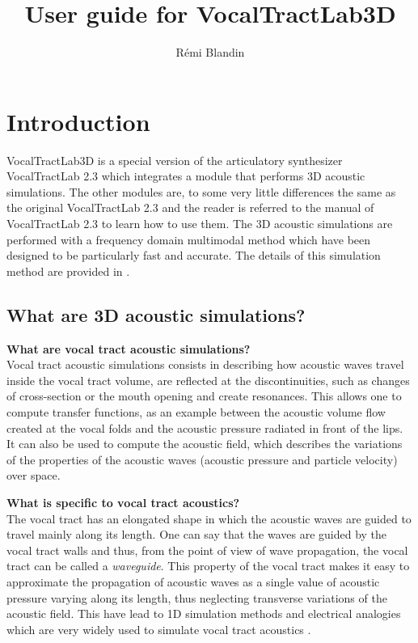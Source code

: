 \documentclass[]{article}
\title{User guide for VocalTractLab3D}
\author{R{\'e}mi Blandin}
\begin{document}
	\maketitle
	
	\section{Introduction}
	
	VocalTractLab3D is a special version of the articulatory synthesizer
	VocalTractLab 2.3 which integrates a module that performs 3D acoustic simulations. The other modules are, to some very little differences the same as the original VocalTractLab 2.3 
	\cite{birkholz2013modeling} and the 
	reader is referred to the manual of VocalTractLab 2.3 to learn
	how to use them.
	The 3D acoustic simulations are performed with a frequency domain
	multimodal method which have been designed to be particularly 
	fast and accurate. The details of this simulation method are 
	provided in \textcite{blandin2022efficient}.
	
	\subsection{What are 3D acoustic simulations?}
	
	\textbf{What are vocal tract acoustic simulations?}\\ 
	Vocal tract acoustic simulations consists in describing how acoustic waves travel
	inside the vocal tract volume, are reflected at the discontinuities, such as 
	changes of cross-section or the mouth opening and create resonances. 
	This allows one to compute transfer functions, as an example between the acoustic volume flow created at the vocal folds and the acoustic pressure radiated in front of the lips. It can also be used to 
	compute the acoustic field, which describes the variations of the  
	properties of the acoustic waves (acoustic pressure and particle velocity) over space.
	
	\textbf{What is specific to vocal tract acoustics?}\\
	The vocal tract has an elongated shape in which the acoustic waves 
	are guided to travel mainly along its length. One can say that the
	waves are guided by the vocal tract walls and thus, from the point
	of view of wave propagation, the vocal tract can be called a 
	\emph{waveguide}.
	This property of the vocal tract makes it easy to approximate the 
	propagation of acoustic waves as a single value of acoustic 
	pressure varying along its length, thus neglecting transverse 
	variations of the acoustic field. This have lead to 1D simulation 
	methods and electrical analogies which are very widely used to 
	simulate vocal tract acoustics \cite{sondhi1987hybrid}.
	
\end{document}

